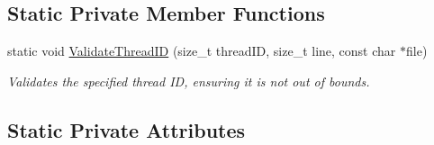 \subsection*{Static Private Member Functions}
\begin{DoxyCompactItemize}
\item 
static void \hyperlink{class_net_utility_af890898fde583d84d73a4bbc8aee64b2}{ValidateThreadID} (size\_\-t threadID, size\_\-t line, const char $\ast$file)
\begin{DoxyCompactList}\small\item\em Validates the specified thread ID, ensuring it is not out of bounds. \item\end{DoxyCompactList}\end{DoxyCompactItemize}
\subsection*{Static Private Attributes}
